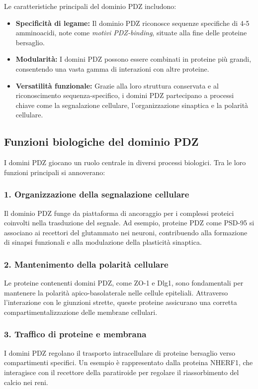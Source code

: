 \documentclass[Lau,binding=0.6cm,oneside,noexaminfo]{sapthesis}
\begin{document}
Le caratteristiche principali del dominio PDZ includono:
\begin{itemize}
    \item \textbf{Specificità di legame:} Il dominio PDZ riconosce sequenze specifiche di 4-5 amminoacidi, note come \emph{motivi PDZ-binding}, situate alla fine delle proteine bersaglio.
    \item \textbf{Modularità:} I domini PDZ possono essere combinati in proteine più grandi, consentendo una vasta gamma di interazioni con altre proteine.
    \item \textbf{Versatilità funzionale:} Grazie alla loro struttura conservata e al riconoscimento sequenza-specifico, i domini PDZ partecipano a processi chiave come la segnalazione cellulare, l’organizzazione sinaptica e la polarità cellulare.
\end{itemize}

\subsection*{Funzioni biologiche del dominio PDZ}

I domini PDZ giocano un ruolo centrale in diversi processi biologici. Tra le loro funzioni principali si annoverano:

\subsubsection*{1. Organizzazione della segnalazione cellulare}
Il dominio PDZ funge da piattaforma di ancoraggio per i complessi proteici coinvolti nella trasduzione del segnale. Ad esempio, proteine PDZ come PSD-95 si associano ai recettori del glutammato nei neuroni, contribuendo alla formazione di sinapsi funzionali e alla modulazione della plasticità sinaptica.

\subsubsection*{2. Mantenimento della polarità cellulare}
Le proteine contenenti domini PDZ, come ZO-1 e Dlg1, sono fondamentali per mantenere la polarità apico-basolaterale nelle cellule epiteliali. Attraverso l’interazione con le giunzioni strette, queste proteine assicurano una corretta compartimentalizzazione delle membrane cellulari.

\subsubsection*{3. Traffico di proteine e membrana}
I domini PDZ regolano il trasporto intracellulare di proteine bersaglio verso compartimenti specifici. Un esempio è rappresentato dalla proteina NHERF1, che interagisce con il recettore della paratiroide per regolare il riassorbimento del calcio nei reni.
\end{document}
